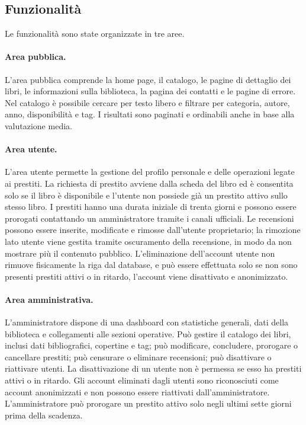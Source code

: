 ﻿\documentclass{article}
\begin{document}
\subsection{Funzionalità}
Le funzionalità sono state organizzate in tre aree.

\paragraph{Area pubblica.}
L'area pubblica comprende la home page, il catalogo, le pagine di dettaglio dei libri, le informazioni sulla biblioteca, la pagina dei contatti e le pagine di errore. Nel catalogo è possibile cercare per testo libero e filtrare per categoria, autore, anno, disponibilità e tag. I risultati sono paginati e ordinabili anche in base alla valutazione media.

\paragraph{Area utente.}
L'area utente permette la gestione del profilo personale e delle operazioni legate ai prestiti. La richiesta di prestito avviene dalla scheda del libro ed è consentita solo se il libro è disponibile e l'utente non possiede già un prestito attivo sullo stesso libro. I prestiti hanno una durata iniziale di trenta giorni e possono essere prorogati contattando un amministratore tramite i canali ufficiali. Le recensioni possono essere inserite, modificate e rimosse dall'utente proprietario; la rimozione lato utente viene gestita tramite oscuramento della recensione, in modo da non mostrare più il contenuto pubblico. L'eliminazione dell'account utente non rimuove fisicamente la riga dal database, e può essere effettuata solo se non sono presenti prestiti attivi o in ritardo, l'account viene disattivato e anonimizzato.

\paragraph{Area amministrativa.}
L'amministratore dispone di una dashboard con statistiche generali, dati della biblioteca e collegamenti alle sezioni operative. Può gestire il catalogo dei libri, inclusi dati bibliografici, copertine e tag; può modificare, concludere, prorogare o cancellare prestiti; può censurare o eliminare recensioni; può disattivare o riattivare utenti. La disattivazione di un utente non è permessa se esso ha prestiti attivi o in ritardo. Gli account eliminati dagli utenti sono riconosciuti come account anonimizzati e non possono essere riattivati dall'amministratore. L'amministratore può prorogare un prestito attivo solo negli ultimi sette giorni prima della scadenza.
\end{document}
